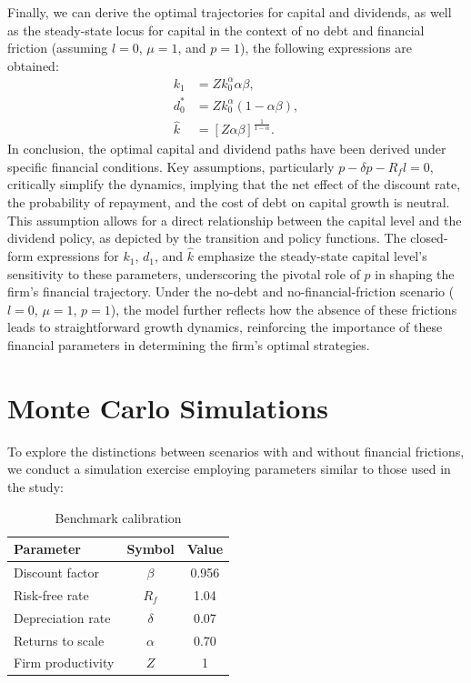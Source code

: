 \documentclass[12pt]{report}
\begin{document}
Finally, we can derive the optimal trajectories for capital and dividends, as well as the steady-state locus for capital in the
context of no debt and financial friction (assuming \(l = 0\), \(\mu = 1\), and \(p = 1\)), the following expressions
are obtained:
\begin{align}
    k_1 &= Z k_0^{\alpha}\alpha\beta, \\
    d^*_0 &= Z k_0^{\alpha}(1-\alpha\beta), \\
    \hat{k} &= \left[Z \alpha \beta \right]^{\frac{1}{1-\alpha}}.
\end{align}
In conclusion, the optimal capital and dividend paths have been derived under specific financial conditions. Key
assumptions, particularly \( p - \delta p - R_f l = 0 \), critically simplify the dynamics, implying that the net effect
of the discount rate, the probability of repayment, and the cost of debt on capital growth is neutral. This assumption
allows for a direct relationship between the capital level and the dividend policy, as depicted by the transition and
policy functions. The closed-form expressions for \( k_1 \), \( d_1 \), and \( \hat{k} \) emphasize the steady-state
capital level's sensitivity to these parameters, underscoring the pivotal role of \( p \) in shaping the firm's
financial trajectory. Under the no-debt and no-financial-friction scenario (\( l = 0 \), \( \mu = 1 \), \( p = 1 \)),
the model further reflects how the absence of these frictions leads to straightforward growth dynamics, reinforcing the
importance of these financial parameters in determining the firm's optimal strategies. 



\section{Monte Carlo Simulations}

To explore the distinctions between scenarios with and without financial frictions, we conduct a simulation exercise
employing  parameters similar to those used in the \cite{OsePap17} study:

\begin{table}[H]
    \centering
    \begin{tabular}{lcc}
    \hline Parameter & Symbol & Value \\
    \hline \hline
    Discount factor & $\beta$ & 0.956 \\
    Risk-free rate & $R_f$ & 1.04 \\
    Depreciation rate & $\delta$ & 0.07 \\
    Returns to scale & $\alpha$ & 0.70 \\
    Firm productivity & $Z$ & 1 \\
    \hline
    \end{tabular}
    \caption{Benchmark calibration}
\end{table}
\end{document}
